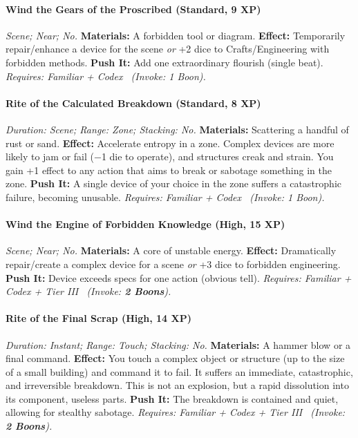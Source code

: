 \documentclass[12pt,twoside]{book}
\begin{document}
\paragraph{Wind the Gears of the Proscribed (Standard, 9 XP)} \emph{Scene; Near; No.}
\textbf{Materials:} A forbidden tool or diagram.
\textbf{Effect:} Temporarily repair/enhance a device for the scene \emph{or} +2 dice to Crafts/Engineering with forbidden methods.
\textbf{Push It:} Add one extraordinary flourish (single beat).
\emph{Requires: Familiar + Codex \ (\textit{Invoke:} 1 Boon).}
\paragraph{Rite of the Calculated Breakdown (Standard, 8 XP)} \emph{Duration: Scene; Range: Zone; Stacking: No.}
\textbf{Materials:} Scattering a handful of rust or sand.
\textbf{Effect:} Accelerate entropy in a zone. Complex devices are more likely to jam or fail (−1 die to operate), and structures creak and strain. You gain +1 effect to any action that aims to break or sabotage something in the zone.
\textbf{Push It:} A single device of your choice in the zone suffers a catastrophic failure, becoming unusable.
\emph{Requires: Familiar + Codex \ (\textit{Invoke:} 1 Boon).}
\paragraph{Wind the Engine of Forbidden Knowledge (High, 15 XP)} \emph{Scene; Near; No.}
\textbf{Materials:} A core of unstable energy.
\textbf{Effect:} Dramatically repair/create a complex device for a scene \emph{or} +3 dice to forbidden engineering.
\textbf{Push It:} Device exceeds specs for one action (obvious tell).
\emph{Requires: Familiar + Codex + Tier III \ (\textit{Invoke:} \textbf{2 Boons}).}
\paragraph{Rite of the Final Scrap (High, 14 XP)} \emph{Duration: Instant; Range: Touch; Stacking: No.}
\textbf{Materials:} A hammer blow or a final command.
\textbf{Effect:} You touch a complex object or structure (up to the size of a small building) and command it to fail. It suffers an immediate, catastrophic, and irreversible breakdown. This is not an explosion, but a rapid dissolution into its component, useless parts.
\textbf{Push It:} The breakdown is contained and quiet, allowing for stealthy sabotage.
\emph{Requires: Familiar + Codex + Tier III \ (\textit{Invoke:} \textbf{2 Boons}).}
\end{document}
